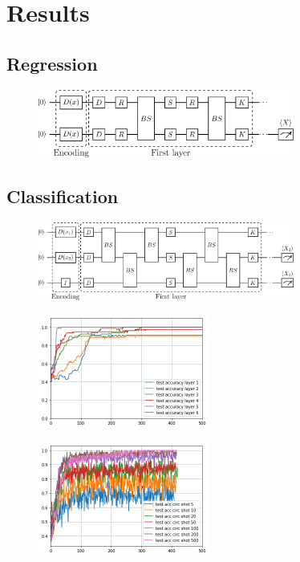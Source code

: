 \documentclass[12pt, a4paper,  nobibnotes]{article}
\begin{document}
\section{Results}
\subsection{Regression}
\begin{figure}[H]
    \centering
    \includegraphics[width=0.75\textwidth]{figures/BasicTwoModeRegressor-circuit.pdf}
    \caption{}
    \label{fig:single_layer_regression}
\end{figure}

\subsection{Classification}
\begin{figure}[H]
    \centering
    \includegraphics[width=0.75\textwidth]{figures/Classifier-Circles-Ansatz.pdf}
    \caption{}
    \label{fig:single_layer_classification}
\end{figure}

\begin{figure}[H]
    \centering
    \includegraphics[width=0.5\textwidth]{figures/test_acc_circles.png}
    \caption{}
    \label{fig:single_layer_regression}
\end{figure}

\begin{figure}[H]
    \centering
    \includegraphics[width=0.5\textwidth]{figures/classifier-test-acc-shots.png}
    \caption{}
    \label{fig:single_layer_regression}
\end{figure}
\end{document}
